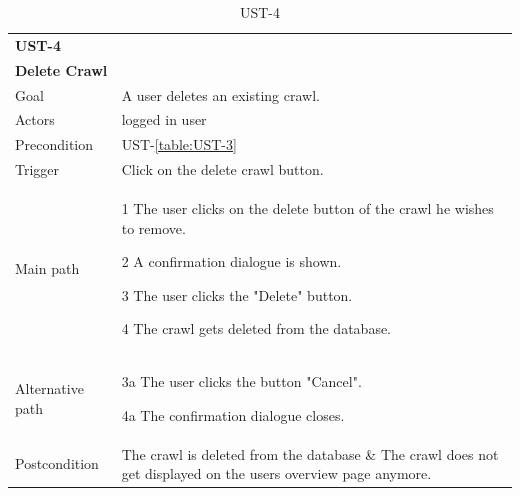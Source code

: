 \documentclass[titlepage, 12pt]{article}
\newenvironment{packed_itemize}{
  \vspace{-\topsep}
  \begin{itemize}
    \setlength{\itemsep}{1pt}
    \setlength{\parskip}{0pt}
    \setlength{\parsep}{0pt}
  }{\end{itemize}}
\begin{document}
  \begin{table}[H]
    \begin{center}
  
      \begin{tabular}{p{4cm}|p{10cm}}
        \textbf{UST-4}\\ \textbf{Delete Crawl}                                            \\
        \hline
        Goal             & A user deletes an existing crawl.                  \\
        \hline
        Actors           & logged in user                                               \\
        \hline
        Precondition     & UST-\ref{table:UST-3}                                     \\
        \hline
        Trigger          & Click on the delete crawl button.                            \\
        \hline
        Main path        &
        \begin{packed_itemize}
          \item [1] The user clicks on the delete button of the crawl he wishes to remove.
          \item [2] A confirmation dialogue is shown.
          \item [3] The user clicks the "Delete" button.
          \item [4] The crawl gets deleted from the database.
        \end{packed_itemize}                                                         \\
        \hline
        Alternative path &
        \begin{packed_itemize}
          \item [3a] The user clicks the button "Cancel".
          \item [4a] The confirmation dialogue closes.
        \end{packed_itemize}                                                         \\
        \hline
        Postcondition    & The crawl is deleted from the database \& The crawl does not get displayed on the users overview page anymore. \\
      \end{tabular}
      \vspace{-2mm}
      \caption{UST-4}
      \label{table:UST-4}
  
    \end{center}
  \end{table}
\end{document}
